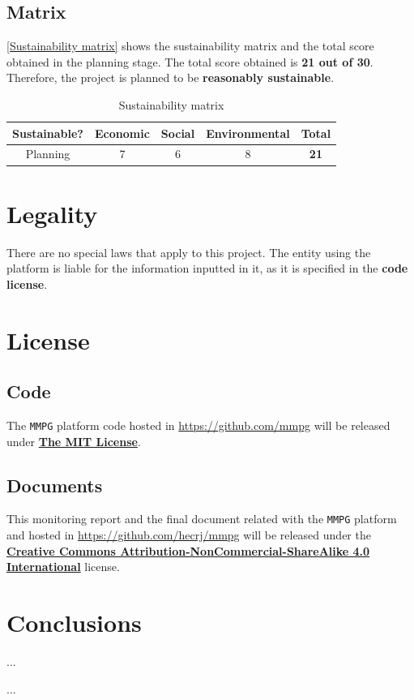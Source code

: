 \documentclass[a4paper,11pt,titlepage,abstract,numbers=noenddot,automark,mnsy,intlimits,rgb,dvipsnames]{report}
\begin{document}
\section{Matrix}
\autoref{Sustainability matrix} shows the sustainability matrix and the total score obtained in the planning
stage. The total score obtained is \textbf{21 out of 30}. Therefore, the project is planned to be \textbf{reasonably sustainable}.
\begin{table}[H]
\centering
\begin{tabular}{c | c | c | c | c}
\textbf{Sustainable?} & \textbf{Economic} & \textbf{Social} & \textbf{Environmental} & \textbf{Total}\\
\hline
Planning & 7 & 6 & 8 & \textbf{21}\\
\end{tabular}
\caption{Sustainability matrix}
\label{Sustainability matrix}
\end{table}
\clearpage
\chapter{Legality}
There are no special laws that apply to this project. The entity using the platform
is liable for the information inputted in it, as it is specified in the \textbf{code license}.
\clearpage
\chapter{License}
\section{Code}
The \texttt{MMPG} platform code hosted in \url{https://github.com/mmpg} will be released under
\href{https://opensource.org/licenses/MIT}{\textbf{The MIT License}}.
\section{Documents}
This monitoring report and the final document related with the \texttt{MMPG} platform and hosted in
\url{https://github.com/hecrj/mmpg} will be released under the
\href{http://creativecommons.org/licenses/by-nc-sa/4.0/legalcode.txt}{\textbf{Creative Commons Attribution-NonCommercial-ShareAlike 4.0 International}}
license.
\clearpage
\chapter{Conclusions}
...
\clearpage


\begin{appendices}
...
\clearpage
\end{appendices}
\end{document}
